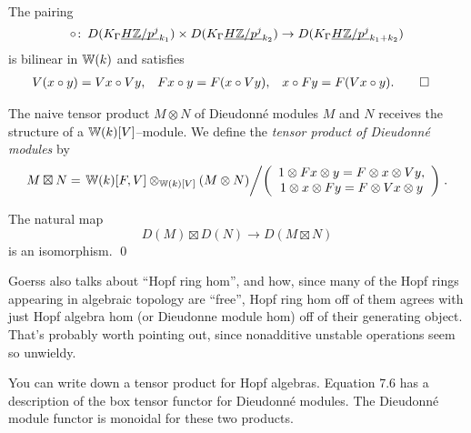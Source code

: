 \begin{lemma}
The pairing \[\circ \colon\thinspace D(K_\Gamma \underline{\smash{H\mathbb Z/p^j}}_{k_1}) \times D(K_\Gamma \underline{\smash{H\mathbb Z/p^j}}_{k_2}) \to D(K_\Gamma \underline{\smash{H\mathbb Z/p^j}}_{k_1 + k_2})\] is bilinear in $\mathbb W(k)$ and satisfies
\begin{align*}
V(x \circ y) & = Vx \circ Vy, &
Fx \circ y & = F(x \circ Vy), &
x \circ Fy & = F(Vx \circ y). \qed
\end{align*}
\end{lemma}

\begin{definition}
The naive tensor product $M \otimes N$ of Dieudonn\'e modules $M$ and $N$ receives the structure of a $\mathbb W(k)[V]$--module.  We define the \textit{tensor product of Dieudonn\'e modules} by \[M \boxtimes N = \left.\mathbb W(k)[F, V] \otimes_{\mathbb W(k)[V]} (M \otimes N) \middle/ \left( \begin{array}{c} 1 \otimes Fx \otimes y = F \otimes x \otimes Vy, \\ 1 \otimes x \otimes Fy = F \otimes Vx \otimes y \end{array} \right) \right. .\]
\end{definition}

\begin{theorem}
The natural map \[D(M) \boxtimes D(N) \to D(M \boxtimes N)\] is an isomorphism. \qed
\end{theorem}

Goerss also talks about ``Hopf ring hom'', and how, since many of the Hopf rings appearing in algebraic topology are ``free'', Hopf ring hom off of them agrees with just Hopf algebra hom (or Dieudonne module hom) off of their generating object.  That's probably worth pointing out, since nonadditive unstable operations seem so unwieldy.


You can write down a tensor product for Hopf algebras.  Equation 7.6 has a description of the box tensor functor for Dieudonn\'e modules.  The Dieudonn\'e module functor is monoidal for these two products.




